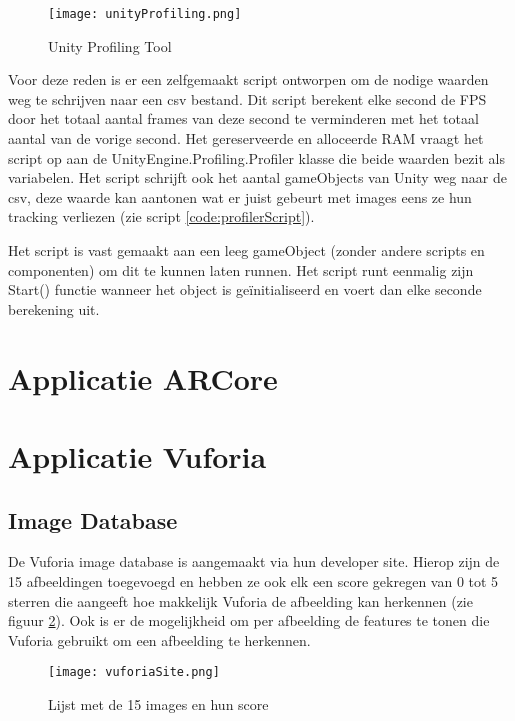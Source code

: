 \begin{figure}
    \texttt{[image: unityProfiling.png]}
    \caption{Unity Profiling Tool}
    \label{fig:unityprofiling}
\end{figure}

Voor deze reden is er een zelfgemaakt script ontworpen om de nodige waarden weg te schrijven naar een csv bestand. Dit script berekent elke second de FPS door het totaal aantal frames van deze second te verminderen met het totaal aantal van de vorige second. Het gereserveerde en alloceerde RAM vraagt het script op aan de UnityEngine.Profiling.Profiler klasse die beide waarden bezit als variabelen. Het script schrijft ook het aantal gameObjects van Unity weg naar de csv, deze waarde kan aantonen wat er juist gebeurt met images eens ze hun tracking verliezen (zie script \ref{code:profilerScript}).

Het script is vast gemaakt aan een leeg gameObject (zonder andere scripts en componenten) om dit te kunnen laten runnen. Het script runt eenmalig zijn Start() functie wanneer het object is geïnitialiseerd en voert dan elke seconde berekening uit.


\section{Applicatie ARCore}

\section{Applicatie Vuforia}

\subsection{Image Database}
De Vuforia image database is aangemaakt via hun developer site. Hierop zijn de 15 afbeeldingen toegevoegd en hebben ze ook elk een score gekregen van 0 tot 5 sterren die aangeeft hoe makkelijk Vuforia de afbeelding kan herkennen (zie figuur \ref{fig:vuforiaDatabase}). Ook is er de mogelijkheid om per afbeelding de features te tonen die Vuforia gebruikt om een afbeelding te herkennen.

\begin{figure}
    \texttt{[image: vuforiaSite.png]}
    \caption{Lijst met de 15 images en hun score}
    \label{fig:vuforiaDatabase}
\end{figure}
